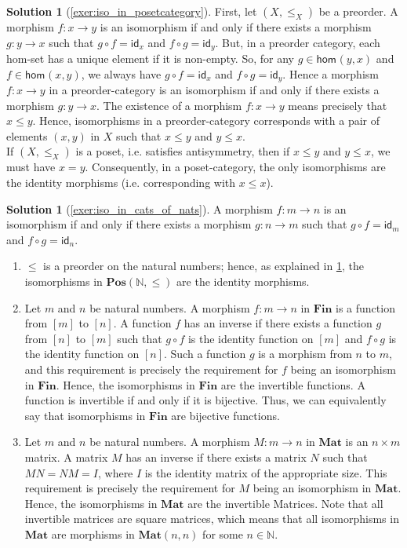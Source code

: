 \documentclass[a4paper,11pt, oneside,titlepage=false]{scrbook}
\theoremstyle{plain}
\theoremstyle{definition}
\newtheorem{solution}[thm]{Solution}
\newcommand{\cfont}[1]{\ensuremath{\mathsf{#1}}}
\newcommand{\Catb}[1]{\mathbf{#1}}
\newcommand{\POS}{\Catb{Pos}}
\newcommand{\MAT}{\Catb{Mat}}
\newcommand{\SKELFINSET}{\Catb{Fin}}
\newcommand{\Hom}[3][]{\cfont{hom}_{#1}(#2,#3)}
\newcommand{\Id}[1][]{\cfont{id}_{#1}}
\newcommand{\co}[2]{\ensuremath{#2 \circ #1}}
\newcommand{\NN}{\ensuremath{\mathbb{N}}}
\begin{document}
\begin{solution}[\cref{exer:iso_in_posetcategory}]\label{sol:iso_in_posetcategory}
First, let $(X,\leq_X)$ be a preorder. A morphism $f:x\to y$ is an isomorphism if and only if there exists a morphism $g: y\to x$ such that $\co{f}{g}=\Id[x]$ and $\co{g}{f}=\Id[y]$. But, in a preorder category, each hom-set has a unique element if it is non-empty. So, for any $g\in \Hom{y}{x}$ and $f\in \Hom{x}{y}$, we always have $\co{f}{g}=\Id[x]$ and $\co{g}{f}=\Id[y]$. Hence a morphism $f:x\to y$ in a preorder-category is an isomorphism if and only if there exists a morphism $g:y\to x$. The existence of a morphism $f:x\to y$ means precisely that $x\leq y$. Hence, isomorphisms in a preorder-category corresponds with a pair of elements $(x,y)$ in $X$ such that $x\leq y$ and $y\leq x$.\\
If $(X,\leq_X)$ is a poset, i.e. satisfies antisymmetry, then if $x\leq y$ and $y\leq x$, we must have $x=y$. Consequently, in a poset-category, the only isomorphisms are the identity morphisms (i.e. corresponding with $x\leq x$).
\end{solution}

\begin{solution}[\cref{exer:iso_in_cats_of_nats}]\label{sol:iso_in_cats_of_nats}
	A morphism $f:m\to n$ is an isomorphism if and only if there exists a morphism $g: n\to m$ such that $\co{f}{g}=\Id[m]$ and $\co{g}{f}=\Id[n]$.
	\begin{enumerate}
		\item $\leq$ is a preorder on the natural numbers; hence, as explained in \cref{sol:iso_in_posetcategory}, the isomorphisms in $\POS(\NN,\leq)$ are the identity morphisms.
		\item Let $m$ and $n$ be natural numbers. A morphism $f : m \to n$ in $\SKELFINSET$ is a function from $[m]$ to $[n]$. A function $f$ has an inverse if there exists a function $g$ from $[n]$ to $[m]$ such that $\co{f}{g}$ is the identity function on $[m]$ and $\co{g}{f}$ is the identity function on $[n]$.
		Such a function $g$ is a morphism from $n$ to $m$, and this requirement is precisely the requirement for $f$ being an isomorphism in $\SKELFINSET$.
		Hence, the isomorphisms in $\SKELFINSET$ are the invertible functions.
		A function is invertible if and only if it is bijective.
		Thus, we can equivalently say that isomorphisms in $\SKELFINSET$ are bijective functions.
		\item  Let $m$ and $n$ be natural numbers.
		A morphism $M : m \to n$ in $\MAT$ is an $n \times m$ matrix. A matrix $M$ has an inverse if there exists a matrix $N$ such that $MN = NM = I$, where $I$ is the identity matrix of the appropriate size.
		This requirement is precisely the requirement for $M$ being an isomorphism in $\MAT$. Hence, the isomorphisms in $\MAT$ are the invertible Matrices.
		Note that all invertible matrices are square matrices, which means that all isomorphisms in $\MAT$ are morphisms in $\MAT(n,n)$ for some $n \in \NN$.
	\end{enumerate}
\end{solution}
\end{document}
